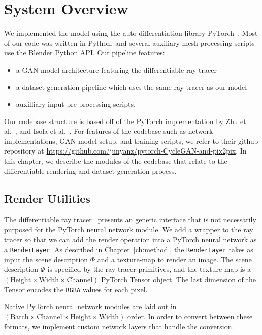 \chapter{System Overview} \label{app:system-overview}

We implemented the model using the auto-differentiation library PyTorch~\cite{paszke2017automatic}.
Most of our code was written in Python, and several auxiliary mesh processing scripts use the Blender
Python API. Our pipeline features:
%
\begin{itemize}
\renewcommand\labelitemi{--}
    \item a GAN model architecture featuring the differentiable ray tracer~\cite{li2018differentiable}
    \item a dataset generation pipeline which uses the same ray tracer as our model
    \item auxilliary input pre-processing scripts.
\end{itemize}

Our codebase structure is based off of the PyTorch implementation by Zhu et al.~\cite{zhu2017unpaired},
and Isola et al.~\cite{isola2017image}. For features of the codebase such as network implementations, GAN
model setup, and training scripts, we refer to their github repository at
\url{https://github.com/junyanz/pytorch-CycleGAN-and-pix2pix}. In this chapter, we describe the modules of
the codebase that relate to the differentiable rendering and dataset generation process.

\section{Render Utilities}

The differentiable ray tracer~\cite{li2018differentiable} presents an generic interface that is not
necessarily purposed for the PyTorch neural network module. We add a wrapper to the ray tracer so that
we can add the render operation into a PyTorch neural network as a \texttt{RenderLayer}. As
described in Chapter~\ref{ch:method}, the \texttt{RenderLayer} takes as input the scene description $\Phi$
and a texture-map to render an image. The scene description $\Phi$ is specified by the ray tracer
primitives, and the texture-map is a $(\text{Height} \times \text{Width} \times \text{Channel})$ PyTorch
Tensor object. The last dimension of the Tensor encodes the \texttt{RGBA} values for each pixel.

Native PyTorch neural network modules are laid out in $(\text{Batch} \times \text{Channel} \times
\text{Height} \times \text{Width})$ order. In order to convert between these formats, we implement custom
network layers that handle the conversion.

